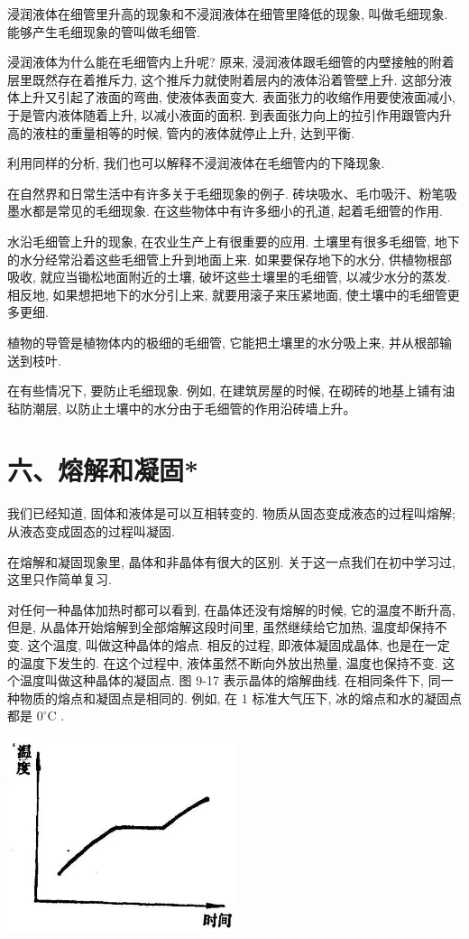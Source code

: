 \documentclass[10pt]{article}
\begin{document}
浸润液体在细管里升高的现象和不浸润液体在细管里降低的现象, 叫做毛细现象. 能够产生毛细现象的管叫做毛细管.

浸润液体为什么能在毛细管内上升呢? 原来, 浸润液体跟毛细管的内壁接触的附着层里既然存在着推斥力, 这个推斥力就使附着层内的液体沿着管壁上升. 这部分液体上升又引起了液面的弯曲, 使液体表面变大. 表面张力的收缩作用要使液面减小, 于是管内液体随着上升, 以减小液面的面积. 到表面张力向上的拉引作用跟管内升高的液柱的重量相等的时候, 管内的液体就停止上升, 达到平衡.

利用同样的分析, 我们也可以解释不浸润液体在毛细管内的下降现象.

在自然界和日常生活中有许多关于毛细现象的例子. 砖块吸水、毛巾吸汗、粉笔吸墨水都是常见的毛细现象. 在这些物体中有许多细小的孔道, 起着毛细管的作用.

水沿毛细管上升的现象, 在农业生产上有很重要的应用. 土壤里有很多毛细管, 地下的水分经常沿着这些毛细管上升到地面上来. 如果要保存地下的水分, 供植物根部吸收, 就应当锄松地面附近的土壤, 破坏这些土壤里的毛细管, 以减少水分的蒸发. 相反地, 如果想把地下的水分引上来, 就要用滚子来压紧地面, 使土壤中的毛细管更多更细.

植物的导管是植物体内的极细的毛细管, 它能把土壤里的水分吸上来, 并从根部输送到枝叶.

在有些情况下, 要防止毛细现象. 例如, 在建筑房屋的时候, 在砌砖的地基上铺有油毡防潮层, 以防止土壤中的水分由于毛细管的作用沿砖墙上升。

\section*{六、熔解和凝固*}

我们已经知道, 固体和液体是可以互相转变的. 物质从固态变成液态的过程叫熔解; 从液态变成固态的过程叫凝固.

在熔解和凝固现象里, 晶体和非晶体有很大的区别. 关于这一点我们在初中学习过, 这里只作简单复习.

对任何一种晶体加热时都可以看到, 在晶体还没有熔解的时候, 它的温度不断升高, 但是, 从晶体开始熔解到全部熔解这段时间里, 虽然继续给它加热, 温度却保持不变. 这个温度, 叫做这种晶体的熔点. 相反的过程, 即液体凝固成晶体, 也是在一定的温度下发生的. 在这个过程中, 液体虽然不断向外放出热量, 温度也保持不变. 这个温度叫做这种晶体的凝固点. 图 9-17 表示晶体的熔解曲线. 在相同条件下, 同一种物质的熔点和凝固点是相同的. 例如, 在 1 标准大气压下, 冰的熔点和水的凝固点都是 \({0}^{ \circ }\mathrm{C}\) .

\begin{center}
\includegraphics[max width=0.5\textwidth]{images/01912d55-147c-70aa-b0e0-1782a122f948_272_312202.jpg}
\end{center}
\end{document}
